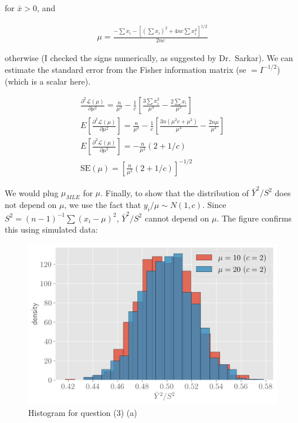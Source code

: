 \documentclass[11pt]{article}
\begin{document}
 for $\bar{x} > 0$, and 
 
 \begin{align*}
     \mu = \frac{-\sum x_i - [(\sum x_i)^2 + 4nc \sum x_i^2]^{1/2}}{2nc}
 \end{align*}
 
 otherwise (I checked the signs numerically, as suggested by Dr.\ Sarkar). We can estimate the standard error from the Fisher information matrix (se $= I^{-1/2}$) (which is a scalar here).
 
 \begin{align*}
     \frac{\partial ^2 \mathcal{L}(\mu)}{\partial \mu^2} = \frac{n}{\mu^2}-\frac{1}{c}\left[\frac{3\sum x_i^2}{\mu^4}-\frac{2\sum x_i}{\mu^3}\right] \\
     E\left[\frac{\partial ^2 \mathcal{L}(\mu)}{\partial \mu^2}\right] = \frac{n}{\mu^2}-\frac{1}{c}\left[\frac{3 n(\mu^2c+\mu^2)}{\mu^4}-\frac{2n\mu}{\mu^3}\right] \\
      E\left[\frac{\partial ^2 \mathcal{L}(\mu)}{\partial \mu^2}\right] =  -\frac{n}{\mu^2} (2+1/c)\\
      \text{SE}(\mu) =  [\frac{n}{\mu^2} (2+1/c)]^{-1/2}
 \end{align*}
 
We would plug $\mu_{MLE}$ for $\mu$. Finally, to show that the distribution of $\bar{Y}^2/S^2$ does not depend on $\mu$, we use the fact that $y_i/\mu \sim N(1, c)$. Since $S^2 =  (n-1)^{-1} \sum(x_i-\mu)^2$,  $\bar{Y}^2/S^2$  cannot depend on $\mu$. The figure confirms this using simulated data:


 
\begin{figure}[!h]
    \centering
    \includegraphics[scale=.55]{homework_2/figures/no_dept.png}
    \caption{Histogram for question (3) (a)}
    \label{fig:my_label}
\end{figure}
 
\end{document}
